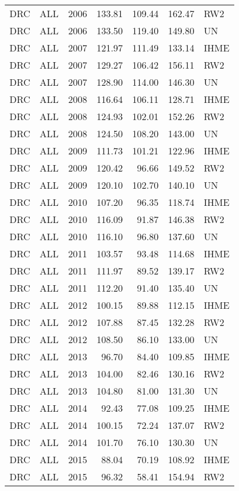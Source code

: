 \begin{longtable}{lllrrrl}
  DRC & ALL & 2006 & 133.81 & 109.44 & 162.47 & RW2 \\ 
  DRC & ALL & 2006 & 133.50 & 119.40 & 149.80 & UN \\ 
  DRC & ALL & 2007 & 121.97 & 111.49 & 133.14 & IHME \\ 
  DRC & ALL & 2007 & 129.27 & 106.42 & 156.11 & RW2 \\ 
  DRC & ALL & 2007 & 128.90 & 114.00 & 146.30 & UN \\ 
  DRC & ALL & 2008 & 116.64 & 106.11 & 128.71 & IHME \\ 
  DRC & ALL & 2008 & 124.93 & 102.01 & 152.26 & RW2 \\ 
  DRC & ALL & 2008 & 124.50 & 108.20 & 143.00 & UN \\ 
  DRC & ALL & 2009 & 111.73 & 101.21 & 122.96 & IHME \\ 
  DRC & ALL & 2009 & 120.42 & 96.66 & 149.52 & RW2 \\ 
  DRC & ALL & 2009 & 120.10 & 102.70 & 140.10 & UN \\ 
  DRC & ALL & 2010 & 107.20 & 96.35 & 118.74 & IHME \\ 
  DRC & ALL & 2010 & 116.09 & 91.87 & 146.38 & RW2 \\ 
  DRC & ALL & 2010 & 116.10 & 96.80 & 137.60 & UN \\ 
  DRC & ALL & 2011 & 103.57 & 93.48 & 114.68 & IHME \\ 
  DRC & ALL & 2011 & 111.97 & 89.52 & 139.17 & RW2 \\ 
  DRC & ALL & 2011 & 112.20 & 91.40 & 135.40 & UN \\ 
  DRC & ALL & 2012 & 100.15 & 89.88 & 112.15 & IHME \\ 
  DRC & ALL & 2012 & 107.88 & 87.45 & 132.28 & RW2 \\ 
  DRC & ALL & 2012 & 108.50 & 86.10 & 133.00 & UN \\ 
  DRC & ALL & 2013 & 96.70 & 84.40 & 109.85 & IHME \\ 
  DRC & ALL & 2013 & 104.00 & 82.46 & 130.16 & RW2 \\ 
  DRC & ALL & 2013 & 104.80 & 81.00 & 131.30 & UN \\ 
  DRC & ALL & 2014 & 92.43 & 77.08 & 109.25 & IHME \\ 
  DRC & ALL & 2014 & 100.15 & 72.24 & 137.07 & RW2 \\ 
  DRC & ALL & 2014 & 101.70 & 76.10 & 130.30 & UN \\ 
  DRC & ALL & 2015 & 88.04 & 70.19 & 108.92 & IHME \\ 
  DRC & ALL & 2015 & 96.32 & 58.41 & 154.94 & RW2 \\ 

\end{longtable}
